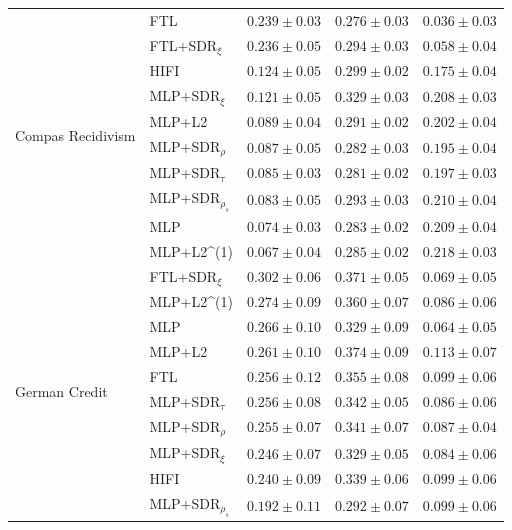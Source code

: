 \begin{tabular}{lllll}
\cline{1-5}
\multirow[t]{10}{*}{Compas Recidivism} & FTL & $0.239 \pm0.03$ & $0.276 \pm0.03$ & $0.036 \pm0.03$ \\
 & FTL+SDR$_{\xi}$ & $0.236 \pm0.05$ & $0.294 \pm0.03$ & $0.058 \pm0.04$ \\
 & HIFI & $0.124 \pm0.05$ & $0.299 \pm0.02$ & $0.175 \pm0.04$ \\
 & MLP+SDR$_{\xi}$ & $0.121 \pm0.05$ & $0.329 \pm0.03$ & $0.208 \pm0.03$ \\
 & MLP+L2 & $0.089 \pm0.04$ & $0.291 \pm0.02$ & $0.202 \pm0.04$ \\
 & MLP+SDR$_{\rho}$ & $0.087 \pm0.05$ & $0.282 \pm0.03$ & $0.195 \pm0.04$ \\
 & MLP+SDR$_{\tau}$ & $0.085 \pm0.03$ & $0.281 \pm0.02$ & $0.197 \pm0.03$ \\
 & MLP+SDR$_{\rho_s}$ & $0.083 \pm0.05$ & $0.293 \pm0.03$ & $0.210 \pm0.04$ \\
 & MLP & $0.074 \pm0.03$ & $0.283 \pm0.02$ & $0.209 \pm0.04$ \\
 & MLP+L2^{(1)} & $0.067 \pm0.04$ & $0.285 \pm0.02$ & $0.218 \pm0.03$ \\
\cline{1-5}
\multirow[t]{10}{*}{German Credit} & FTL+SDR$_{\xi}$ & $0.302 \pm0.06$ & $0.371 \pm0.05$ & $0.069 \pm0.05$ \\
 & MLP+L2^{(1)} & $0.274 \pm0.09$ & $0.360 \pm0.07$ & $0.086 \pm0.06$ \\
 & MLP & $0.266 \pm0.10$ & $0.329 \pm0.09$ & $0.064 \pm0.05$ \\
 & MLP+L2 & $0.261 \pm0.10$ & $0.374 \pm0.09$ & $0.113 \pm0.07$ \\
 & FTL & $0.256 \pm0.12$ & $0.355 \pm0.08$ & $0.099 \pm0.06$ \\
 & MLP+SDR$_{\tau}$ & $0.256 \pm0.08$ & $0.342 \pm0.05$ & $0.086 \pm0.06$ \\
 & MLP+SDR$_{\rho}$ & $0.255 \pm0.07$ & $0.341 \pm0.07$ & $0.087 \pm0.04$ \\
 & MLP+SDR$_{\xi}$ & $0.246 \pm0.07$ & $0.329 \pm0.05$ & $0.084 \pm0.06$ \\
 & HIFI & $0.240 \pm0.09$ & $0.339 \pm0.06$ & $0.099 \pm0.06$ \\
 & MLP+SDR$_{\rho_s}$ & $0.192 \pm0.11$ & $0.292 \pm0.07$ & $0.099 \pm0.06$ \\
\cline{1-5}
\bottomrule
\end{tabular}
